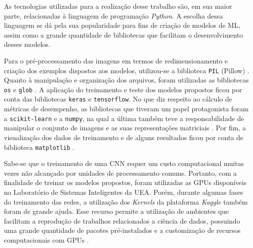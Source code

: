 
As tecnologias utilizadas para a realização desse trabalho são, em sua maior parte, relacionadas à linguagem de programação \emph{Python}. A escolha dessa linguagem se dá pela sua popularidade para fins de criação de modelos de ML, assim como a grande quantidade de bibliotecas que facilitam o desenvolvimento desses modelos.

Para o pré-processamento das imagens em termos de redimensionamento e criação dos exemplos dispostos aos modelos, utilizou-se a biblioteca \texttt{PIL} (Pillow) \cite{pillow}. Quanto à manipulação e organização dos arquivos, foram utilizadas as bibliotecas \texttt{os} e \texttt{glob} \cite{os,glob}. A aplicação do treinamento e teste dos modelos propostos ficou por conta das bibliotecas \texttt{keras} e \texttt{tensorflow}\cite{keras, tensorflow}. No que diz respeito ao cálculo de métricas de desempenho, as bibliotecas que tiveram um papel protagonista foram a \texttt{scikit-learn} e a \texttt{numpy}, na qual a última também teve a responsabilidade de manipular o conjunto de imagens e as suas representações matriciais \cite{sklearn,numpy}. Por fim, a visualização dos dados de treinamento e de alguns resultados ficou por conta de biblioteca \texttt{matplotlib} \cite{matplotlib}.

Sabe-se que o treinamento de uma CNN requer um custo computacional muitas vezes não alcançado por unidades de processamento comuns. Portanto, com a finalidade de treinar os modelos propostos, foram utilizadas as GPUs disponíveis no Laboratório de Sistemas Inteligentes da UEA. Porém, durante algumas fases do treinamento das redes, a utilização dos \emph{Kernels} da plataforma \emph{Kaggle} também foram de grande ajuda. Esse recurso permite a utilização de ambientes que facilitam a reprodução de trabalhos relacionados a ciência de dados, possuindo uma grande quantidade de pacotes pré-instalados e a customização de recursos computacionais com GPUs \cite{kaggle}.

